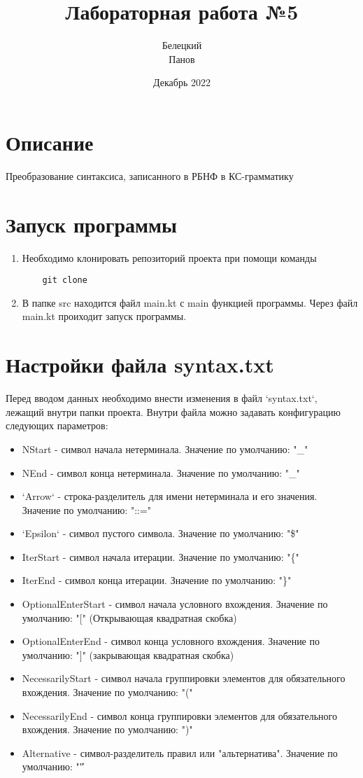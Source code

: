 \documentclass{article}
\title{Лабораторная работа №5}
\author{Белецкий\\ Панов}
\date{Декабрь 2022}
\begin{document}
\maketitle

\section{Описание}
Преобразование синтаксиса, записанного в РБНФ в КС-грамматику

\section{Запуск программы}

\begin{enumerate}
  \item Необходимо клонировать репозиторий проекта при помощи команды
  \begin{lstlisting}
    git clone
    \end{lstlisting}
  \item В папке src находится файл main.kt с main функцией программы. Через файл main.kt проиходит запуск программы.
\end{enumerate}

\section{Настройки файла syntax.txt}
Перед вводом данных необходимо внести изменения в файл `syntax.txt`, лежащий внутри папки проекта.
Внутри файла можно задавать конфигурацию следующих параметров:
\begin{itemize}
  \item NStart - символ начала нетерминала. Значение по умолчанию: "\_"
  \item NEnd - символ конца нетерминала. Значение по умолчанию: "\_"
  \item `Arrow` - строка-разделитель для имени нетерминала и его значения. Значение по умолчанию: "::="
  \item `Epsilon` - символ пустого символа. Значение по умолчанию: "\$"
  \item IterStart - символ начала итерации. Значение по умолчанию: "\{"
  \item IterEnd - символ конца итерации. Значение по умолчанию: "\}"
  \item OptionalEnterStart - символ начала условного вхождения. Значение по умолчанию: "[" (Открывающая квадратная скобка)
  \item OptionalEnterEnd - символ конца условного вхождения. Значение по умолчанию: "]" (закрывающая квадратная скобка)
  \item NecessarilyStart - символ начала группировки элементов для обязательного вхождения. Значение по умолчанию: "("
  \item NecessarilyEnd - символ конца группировки элементов для обязательного вхождения. Значение по умолчанию: ")"
  \item Alternative - символ-разделитель правил или "альтернатива". Значение по умолчанию: "\|"

\end{itemize}
\end{document}
